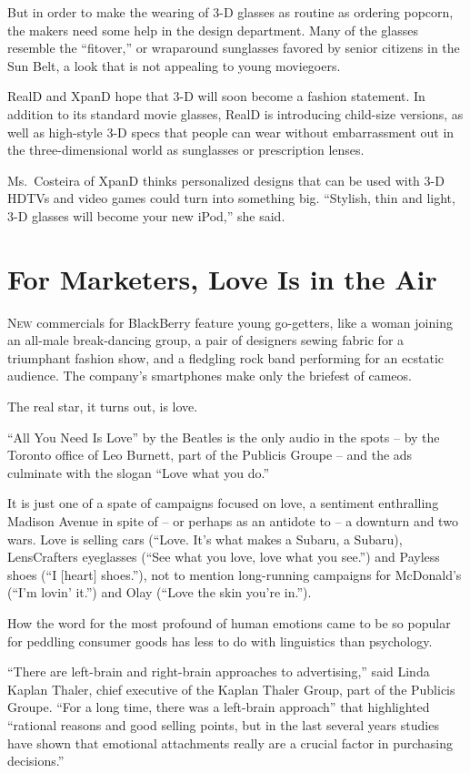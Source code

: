 ﻿\documentclass[12pt]{article}
\begin{document}
But in order to make the wearing of 3-D glasses as routine as ordering popcorn, the makers need some
help in the design department. Many of the glasses resemble the ``fitover,'' or wraparound
sunglasses favored by senior citizens in the Sun Belt, a look that is not appealing to young
moviegoers.

RealD and XpanD hope that 3-D will soon become a fashion statement. In addition to its standard
movie glasses, RealD is introducing child-size versions, as well as high-style 3-D specs that people
can wear without embarrassment out in the three-dimensional world as sunglasses or prescription
lenses.

Ms.~Costeira of XpanD thinks personalized designs that can be used with 3-D HDTVs and video games
could turn into something big. ``Stylish, thin and light, 3-D glasses will become your new iPod,''
she said.

\section{For Marketers, Love Is in the Air}

\lettrine{N}{ew} commercials for BlackBerry feature young go-getters, like a
woman joining an all-male break-dancing group, a pair of designers sewing fabric for a triumphant
fashion show, and a fledgling rock band performing for an ecstatic audience. The company's
smartphones make only the briefest of cameos.

The real star, it turns out, is love.

``All You Need Is Love'' by the Beatles is the only audio in the spots -- by the Toronto office of
Leo Burnett, part of the Publicis Groupe -- and the ads culminate with the slogan ``Love what you
do.''

It is just one of a spate of campaigns focused on love, a sentiment enthralling Madison Avenue in
spite of -- or perhaps as an antidote to -- a downturn and two wars. Love is selling cars (``Love.
It's what makes a Subaru, a Subaru), LensCrafters eyeglasses (``See what you love, love what you
see.'') and Payless shoes (``I $[$heart$]$ shoes.''), not to mention long-running campaigns for
McDonald's (``I'm lovin' it.'') and Olay (``Love the skin you're in.'').

How the word for the most profound of human emotions came to be so popular for peddling consumer
goods has less to do with linguistics than psychology.

``There are left-brain and right-brain approaches to advertising,'' said Linda Kaplan Thaler, chief
executive of the Kaplan Thaler Group, part of the Publicis Groupe. ``For a long time, there was a
left-brain approach'' that highlighted ``rational reasons and good selling points, but in the last
several years studies have shown that emotional attachments really are a crucial factor in
purchasing decisions.''
\end{document}
